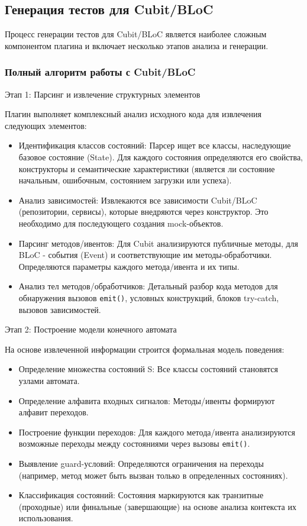 \documentclass[14pt, russian]{scrartcl}
\begin{document}
\subsection{Генерация тестов для Cubit/BLoC}

Процесс генерации тестов для Cubit/BLoC является наиболее сложным компонентом плагина и включает несколько этапов анализа и генерации.

\subsubsection{Полный алгоритм работы с Cubit/BLoC}

Этап 1: Парсинг и извлечение структурных элементов

Плагин выполняет комплексный анализ исходного кода для извлечения следующих элементов:
\begin{itemize}
    \item Идентификация классов состояний: Парсер ищет все классы, наследующие базовое состояние (State). Для каждого состояния определяются его свойства, конструкторы и семантические характеристики (является ли состояние начальным, ошибочным, состоянием загрузки или успеха).
    \item Анализ зависимостей: Извлекаются все зависимости Cubit/BLoC (репозитории, сервисы), которые внедряются через конструктор. Это необходимо для последующего создания mock-объектов.
    \item Парсинг методов/ивентов: Для Cubit анализируются публичные методы, для BLoC - события (Event) и соответствующие им методы-обработчики. Определяются параметры каждого метода/ивента и их типы.
    \item Анализ тел методов/обработчиков: Детальный разбор кода методов для обнаружения вызовов \texttt{emit()}, условных конструкций, блоков try-catch, вызовов зависимостей.
\end{itemize}

Этап 2: Построение модели конечного автомата

На основе извлеченной информации строится формальная модель поведения:
\begin{itemize}
    \item Определение множества состояний S: Все классы состояний становятся узлами автомата.
    \item Определение алфавита входных сигналов: Методы/ивенты формируют алфавит переходов.
    \item Построение функции переходов: Для каждого метода/ивента анализируются возможные переходы между состояниями через вызовы \texttt{emit()}.
    \item Выявление guard-условий: Определяются ограничения на переходы (например, метод может быть вызван только в определенных состояниях).
    \item Классификация состояний: Состояния маркируются как транзитные (проходные) или финальные (завершающие) на основе анализа контекста их использования.
\end{itemize}
\end{document}
